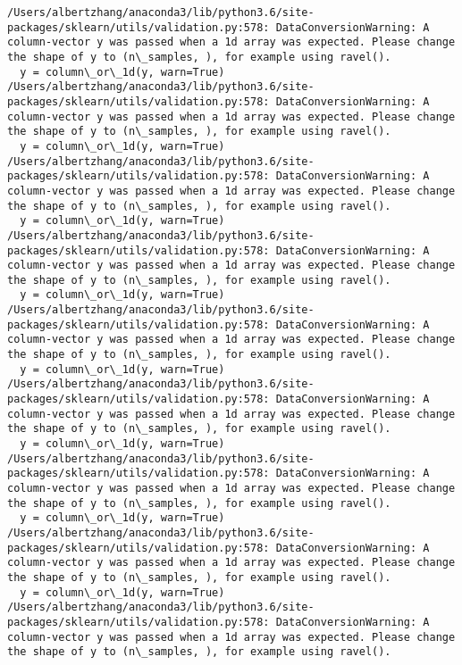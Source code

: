\documentclass[11pt]{article}
\begin{document}
    \begin{Verbatim}[commandchars=\\\{\}]
/Users/albertzhang/anaconda3/lib/python3.6/site-packages/sklearn/utils/validation.py:578: DataConversionWarning: A column-vector y was passed when a 1d array was expected. Please change the shape of y to (n\_samples, ), for example using ravel().
  y = column\_or\_1d(y, warn=True)
/Users/albertzhang/anaconda3/lib/python3.6/site-packages/sklearn/utils/validation.py:578: DataConversionWarning: A column-vector y was passed when a 1d array was expected. Please change the shape of y to (n\_samples, ), for example using ravel().
  y = column\_or\_1d(y, warn=True)
/Users/albertzhang/anaconda3/lib/python3.6/site-packages/sklearn/utils/validation.py:578: DataConversionWarning: A column-vector y was passed when a 1d array was expected. Please change the shape of y to (n\_samples, ), for example using ravel().
  y = column\_or\_1d(y, warn=True)
/Users/albertzhang/anaconda3/lib/python3.6/site-packages/sklearn/utils/validation.py:578: DataConversionWarning: A column-vector y was passed when a 1d array was expected. Please change the shape of y to (n\_samples, ), for example using ravel().
  y = column\_or\_1d(y, warn=True)
/Users/albertzhang/anaconda3/lib/python3.6/site-packages/sklearn/utils/validation.py:578: DataConversionWarning: A column-vector y was passed when a 1d array was expected. Please change the shape of y to (n\_samples, ), for example using ravel().
  y = column\_or\_1d(y, warn=True)
/Users/albertzhang/anaconda3/lib/python3.6/site-packages/sklearn/utils/validation.py:578: DataConversionWarning: A column-vector y was passed when a 1d array was expected. Please change the shape of y to (n\_samples, ), for example using ravel().
  y = column\_or\_1d(y, warn=True)
/Users/albertzhang/anaconda3/lib/python3.6/site-packages/sklearn/utils/validation.py:578: DataConversionWarning: A column-vector y was passed when a 1d array was expected. Please change the shape of y to (n\_samples, ), for example using ravel().
  y = column\_or\_1d(y, warn=True)
/Users/albertzhang/anaconda3/lib/python3.6/site-packages/sklearn/utils/validation.py:578: DataConversionWarning: A column-vector y was passed when a 1d array was expected. Please change the shape of y to (n\_samples, ), for example using ravel().
  y = column\_or\_1d(y, warn=True)
/Users/albertzhang/anaconda3/lib/python3.6/site-packages/sklearn/utils/validation.py:578: DataConversionWarning: A column-vector y was passed when a 1d array was expected. Please change the shape of y to (n\_samples, ), for example using ravel().

\end{Verbatim}
\end{document}
